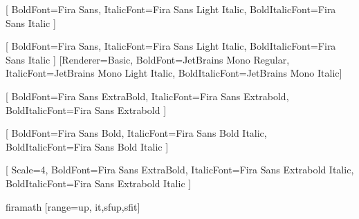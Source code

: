 \RequirePackage{microtype}
\RequirePackage{polyglossia}
\setdefaultlanguage{french}
\RequirePackage{fontspec}
\RequirePackage{amssymb}

[
  BoldFont={Fira Sans},
  ItalicFont={Fira Sans Light Italic},
  BoldItalicFont={Fira Sans Italic}
]

\setsansfont{Fira Sans Light}[
  BoldFont={Fira Sans},
  ItalicFont={Fira Sans Light Italic},
  BoldItalicFont={Fira Sans Italic}
]
\setmonofont{JetBrains Mono Light}[Renderer=Basic,
  BoldFont={JetBrains Mono Regular},
  ItalicFont={JetBrains Mono Light Italic},
  BoldItalicFont={JetBrains Mono Italic}]%

[
  BoldFont={Fira Sans ExtraBold},
  ItalicFont={Fira Sans Extrabold},
  BoldItalicFont={Fira Sans Extrabold}
]

[
  BoldFont={Fira Sans Bold},
  ItalicFont={Fira Sans Bold Italic},
  BoldItalicFont={Fira Sans Bold Italic}
]

[
  Scale=4,
  BoldFont={Fira Sans ExtraBold},
  ItalicFont={Fira Sans Extrabold Italic},
  BoldItalicFont={Fira Sans Extrabold Italic}
]

\ifcsname firamath\endcsname%
\RequirePackage[math-style=french,bold-style=ISO]{unicode-math}
[range={up, it,sfup,sfit}]

\fi

